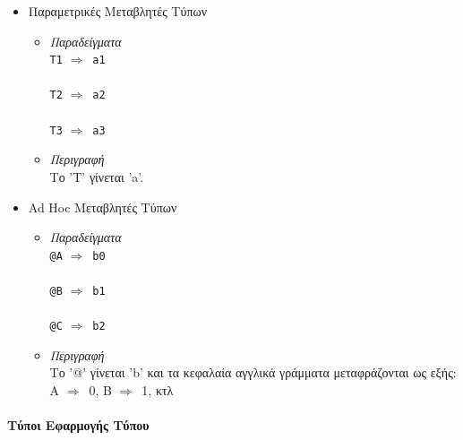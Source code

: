 \documentclass[diploma]{softlab-thesis}
\def\lra{$\Longrightarrow$\ }
\begin{document}
\begin{itemize}

\item
Παραμετρικές Μεταβλητές Τύπων

\begin{itemize}

\item
\textit{Παραδείγματα}\\

\verb|T1| \lra \verb|a1|\\\\
\verb|T2| \lra \verb|a2|\\\\
\verb|T3| \lra \verb|a3|\\

\item
\textit{Περιγραφή}\\

Το 'T' γίνεται 'a'.
\end{itemize}

\item
Ad Hoc Μεταβλητές Τύπων

\begin{itemize}
\item
\textit{Παραδείγματα}\\

\verb|@A| \lra \verb|b0|\\\\
\verb|@B| \lra \verb|b1|\\\\
\verb|@C| \lra \verb|b2|\\
\item
\textit{Περιγραφή}\\

Το '@' γίνεται 'b' και τα κεφαλαία αγγλικά γράμματα μεταφράζονται ως εξής:\\
A \lra 0, B \lra 1, κτλ
\end{itemize}

\end{itemize}

\newpage
\paragraph{Τύποι Εφαρμογής Τύπου}
\end{document}
